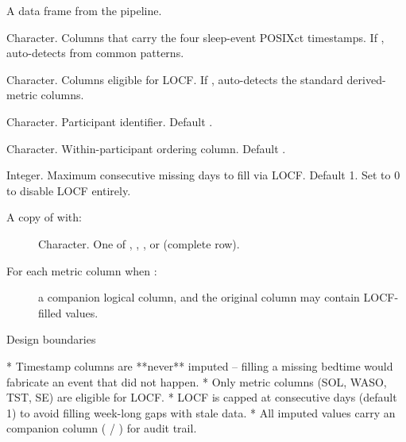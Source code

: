 \documentclass[a4paper]{book}
\begin{document}
%
\begin{Arguments}
\begin{ldescription}
\item[\code{data}] A data frame from the pipeline.

\item[\code{timestamp\_cols}] Character. Columns that carry the four sleep-event
POSIXct timestamps. If , auto-detects from common patterns.

\item[\code{metric\_cols}] Character. Columns eligible for LOCF. If ,
auto-detects the standard derived-metric columns.

\item[\code{group\_col}] Character. Participant identifier. Default .

\item[\code{order\_col}] Character. Within-participant ordering column. Default
.

\item[\code{max\_gap}] Integer. Maximum consecutive missing days to fill via
LOCF. Default 1. Set to 0 to disable LOCF entirely.
\end{ldescription}
\end{Arguments}
%
\begin{Value}
A copy of  with:
\begin{description}

\item[] Character. One of ,
, , or 
(complete row).
\item[For each metric column when :] a companion
 logical column, and the original column may
contain LOCF-filled values.

\end{description}

\end{Value}
%
\begin{Section}{Design boundaries}


* Timestamp columns are **never** imputed -- filling a missing bedtime
would fabricate an event that did not happen.
* Only metric columns (SOL, WASO, TST, SE) are eligible for LOCF.
* LOCF is capped at  consecutive days (default 1) to
avoid filling week-long gaps with stale data.
* All imputed values carry an  companion column
( / ) for audit trail.
\end{Section}
\end{document}
